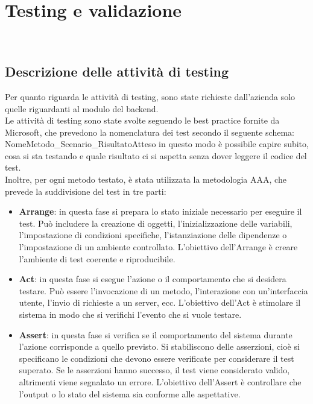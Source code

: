 \chapter{Testing e validazione}
\label{cap:testing}
\\
\section{Descrizione delle attività di testing}
Per quanto riguarda le attività di testing, sono state richieste dall'azienda solo quelle riguardanti al modulo del backend.\\
Le attività di testing sono state svolte seguendo le best practice fornite da Microsoft, che prevedono la nomenclatura dei test secondo il seguente schema:\\
NomeMetodo\_Scenario\_RisultatoAtteso in questo modo è possibile capire subito, cosa si sta testando e quale risultato ci si aspetta senza dover leggere il codice del test.\\
Inoltre, per ogni metodo testato, è stata utilizzata la metodologia \gls{AAA}, che prevede la suddivisione del test in tre parti:
\begin{itemize}
    \item \textbf{Arrange}: in questa fase si prepara lo stato iniziale necessario per eseguire il test. Può includere la creazione di oggetti, l'inizializzazione delle variabili, l'impostazione di condizioni specifiche, l'istanziazione delle dipendenze o l'impostazione di un ambiente controllato. L'obiettivo dell'Arrange è creare l'ambiente di test coerente e riproducibile.
    \item \textbf{Act}: in questa fase si esegue l'azione o il comportamento che si desidera testare. Può essere l'invocazione di un metodo, l'interazione con un'interfaccia utente, l'invio di richieste a un server, ecc. L'obiettivo dell'Act è stimolare il sistema in modo che si verifichi l'evento che si vuole testare.
    \item \textbf{Assert}: in questa fase si verifica se il comportamento del sistema durante l'azione corrisponde a quello previsto. Si stabiliscono delle asserzioni, cioè si specificano le condizioni che devono essere verificate per considerare il test superato. Se le asserzioni hanno successo, il test viene considerato valido, altrimenti viene segnalato un errore. L'obiettivo dell'Assert è controllare che l'output o lo stato del sistema sia conforme alle aspettative.
\end{itemize}

